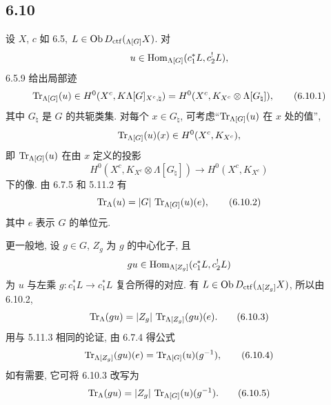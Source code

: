 \subsection*{6.10}
设 $X$, $c$ 如 6.5, $L\in\operatorname{Ob} D_{\mathrm{ctf}}({}_{\Lambda[G]}X)$. 对
\[
u\in\operatorname{Hom}_{\Lambda[G]}(c_1^*L,c_2^!L),
\]
6.5.9 给出局部迹
\begin{equation}
\operatorname{Tr}_{\Lambda[G]}(u)\in
H^0(X^c,K\Lambda[G]_{X^c,\natural})
=H^0(X^c,K_{X^c}\otimes\Lambda[G_{\natural}]),
\tag{6.10.1}
\end{equation}
其中 $G_{\natural}$ 是 $G$ 的共轭类集. 对每个 $x\in G_{\natural}$, 可考虑``$\operatorname{Tr}_{\Lambda[G]}(u)$ 在 $x$ 处的值'',
\[
\operatorname{Tr}_{\Lambda[G]}(u)(x)\in H^0(X^c,K_{X^c}),
\]
即 $\operatorname{Tr}_{\Lambda[G]}(u)$ 在由 $x$ 定义的投影
\[
H^0(X^c,K_{X^c}\otimes\Lambda[G_{\natural}])
\longrightarrow H^0(X^c,K_{X^c})
\]
下的像. 由 6.7.5 和 5.11.2 有
\begin{equation}
\operatorname{Tr}_{\Lambda}(u)=|G|\,\operatorname{Tr}_{\Lambda[G]}(u)(e),
\tag{6.10.2}
\end{equation}
其中 $e$ 表示 $G$ 的单位元.

更一般地, 设 $g\in G$, $Z_g$ 为 $g$ 的中心化子, 且
\[
gu\in\operatorname{Hom}_{\Lambda[Z_g]}(c_1^*L,c_2^!L)
\]
为 $u$ 与左乘 $g:c_1^*L\to c_1^*L$ 复合所得的对应. 有 $L\in\operatorname{Ob} D_{\mathrm{ctf}}({}_{\Lambda[Z_g]}X)$, 所以由 6.10.2,
\begin{equation}
\operatorname{Tr}_{\Lambda}(gu)=|Z_g|\,\operatorname{Tr}_{\Lambda[Z_g]}(gu)(e).
\tag{6.10.3}
\end{equation}
用与 5.11.3 相同的论证, 由 6.7.4 得公式
\begin{equation}
\operatorname{Tr}_{\Lambda[Z_g]}(gu)(e)=\operatorname{Tr}_{\Lambda[G]}(u)(g^{-1}),
\tag{6.10.4}
\end{equation}
如有需要, 它可将 6.10.3 改写为
\begin{equation}
\operatorname{Tr}_{\Lambda}(gu)=|Z_g|\,\operatorname{Tr}_{\Lambda[G]}(u)(g^{-1}).
\tag{6.10.5}
\end{equation}

